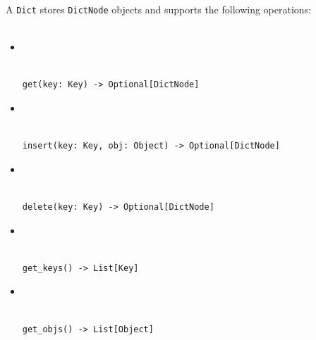 \documentclass[mathserif, handout]{beamer}
\begin{document}
\begin{frame}[fragile]
	A \texttt{Dict} stores \texttt{DictNode} objects and supports the following operations:\\~\\
	\begin{itemize}

		\item {} \\
		      \\[-1mm]
		      \begin{lstlisting}[style=mypython]
get(key: Key) -> Optional[DictNode]
\end{lstlisting}

		\item {} \\
		      \\[-1mm]
		      \begin{lstlisting}[style=mypython]
insert(key: Key, obj: Object) -> Optional[DictNode]
\end{lstlisting}

		\item {} \\
		      \\[-1mm]
		      \begin{lstlisting}[style=mypython]
delete(key: Key) -> Optional[DictNode]
\end{lstlisting}

	\end{itemize}
\end{frame}

\begin{frame}[fragile]
	\begin{itemize}

		\item {} \\
		      \\[-1mm]
		      \begin{lstlisting}[style=mypython]
get_keys() -> List[Key]
\end{lstlisting}

		\item {} \\
		      \\[-1mm]
		      \begin{lstlisting}[style=mypython]
get_objs() -> List[Object]
\end{lstlisting}

	\end{itemize}
\end{frame}
\end{document}
